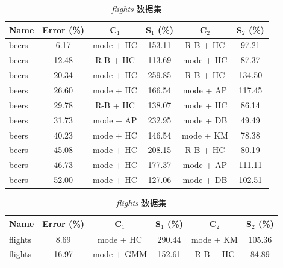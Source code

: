 \documentclass[10pt]{article} %
\numberwithin{equation}{section}
\begin{document}
\begin{table}[htbp]
    \centering
    \footnotesize %
    \setlength{\tabcolsep}{4pt} %
    \renewcommand{\arraystretch}{1.1} %
    \begin{subtable}{0.48\linewidth} %
        \centering
        \caption{\textit{beers} 数据集}
        \label{tab:beers_results}
        \begin{tabular}{lccccc}
            \toprule
            \textbf{Name} & \textbf{Error (\%)} & \textbf{C$_1$} & \textbf{S$_1$ (\%)} & \textbf{C$_2$} & \textbf{S$_2$ (\%)} \\
            \midrule
            beers & 6.17  & mode + HC  & 153.11 & R-B + HC  & 97.21 \\
            beers & 12.48 & R-B + HC   & 113.69 & mode + HC & 87.37 \\
            beers & 20.34 & mode + HC  & 259.85 & R-B + HC  & 134.50 \\
            beers & 26.60 & mode + HC  & 166.54 & mode + AP & 117.45 \\
            beers & 29.78 & R-B + HC   & 138.07 & mode + HC & 86.14 \\
            beers & 31.73 & mode + AP  & 232.95 & mode + DB & 49.49 \\
            beers & 40.23 & mode + HC  & 146.54 & mode + KM & 78.38 \\
            beers & 45.08 & mode + HC  & 208.15 & R-B + HC  & 80.19 \\
            beers & 46.73 & mode + HC  & 177.37 & mode + AP & 111.11 \\
            beers & 52.00 & mode + HC  & 127.06 & mode + DB & 102.51 \\
            \bottomrule
        \end{tabular}
    \end{subtable}
    \hfill
    \begin{subtable}{0.48\linewidth} %
        \centering
        \caption{\textit{flights} 数据集}
        \label{tab:flights_results}
        \begin{tabular}{lccccc}
            \toprule
            \textbf{Name} & \textbf{Error (\%)} & \textbf{C$_1$} & \textbf{S$_1$ (\%)} & \textbf{C$_2$} & \textbf{S$_2$ (\%)} \\
            \midrule
            flights & 8.69  & mode + HC  & 290.44 & mode + KM  & 105.36 \\
            flights & 16.97 & mode + GMM & 152.61 & R-B + HC   & 84.89 \\

\end{tabular}
\end{subtable}
\end{table}
\end{document}
